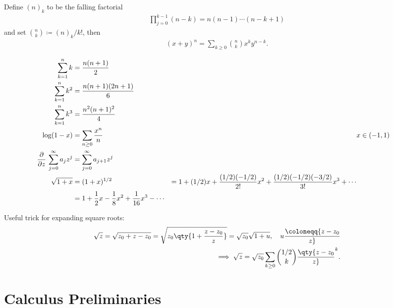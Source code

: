 \begin{fact}

Define \((n)_k\) to be the falling factorial
\begin{align*}
\prod_{j=0}^{k-1} (n-k) = n(n-1)\cdots(n-k+1)
\end{align*}
and set \({n\choose k} \coloneqq(n)_k/k!\), then
\begin{align*}
(x+y)^n = \sum_{k\geq 0} {n\choose k} x^{k}y^{n-k}
.\end{align*}

\end{fact}

\begin{fact}

\begin{align*}
\sum_{k=1}^{n} k &=\frac{n(n+1)}{2} \\
\sum_{k=1}^{n} k^{2} &=\frac{n(n+1)(2 n+1)}{6} \\
\sum_{k=1}^{n} k^{3} &=\frac{n^{2}(n+1)^{2}}{4}  \\
\log(1-x) 
  &= \sum_{n \geq 0} {x^n\over n} && x\in (-1, 1)\\
{\frac{\partial }{\partial z}\,} \sum_{j=0}^\infty a_j z^j 
  &= \sum_{j=0}^\infty a_{j+1}z^j \\
\sqrt{1+x} 
  &= (1+x)^{1/2} &= 1 + (1/2)x + {(1/2)(-1/2) \over 2!}x^2 + {(1/2)(-1/2)(-3/2) \over 3!}x^3 + \cdots \\
  &= 1 + {1\over 2} x - {1\over 8}x^2 + {1\over 16}x^3 - \cdots
\end{align*}

\end{fact}

\begin{fact}

Useful trick for expanding square roots:
\begin{align*}
\sqrt{z} = \sqrt{z_0 + z - z_0} = \sqrt{z_0 \qty{ 1 + {z-z_0 \over z} }} = \sqrt{z_0} \sqrt{1+u},\quad u\coloneqq{z-z_0 \over z} \\
\implies \sqrt{z} = \sqrt{z_0} \sum_{k\geq 0} {1/2 \choose k} \qty{z- z_0 \over z}^k
.\end{align*}

\end{fact}

\hypertarget{calculus-preliminaries}{%
\section{Calculus Preliminaries}\label{calculus-preliminaries}}

